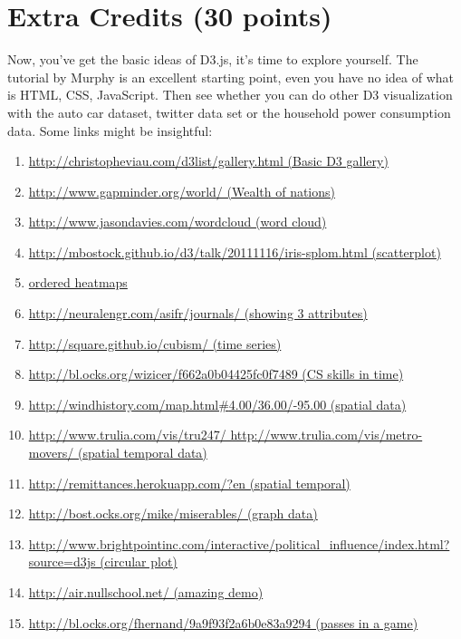 \documentclass[a4paper, 11pt]{article}
\begin{document}
\section{Extra Credits (30 points)}
Now, you've get the basic ideas of D3.js, it's time to explore yourself. The tutorial by Murphy is an excellent starting point, even you have no idea of what is HTML, CSS, JavaScript. Then see whether you can do other D3 visualization with the auto car dataset, twitter data set or the household power consumption data. Some links might be insightful:
\begin{enumerate}
\item \href{http://christopheviau.com/d3list/gallery.html}{http://christopheviau.com/d3list/gallery.html (Basic D3 gallery)}
\item \href{http://www.gapminder.org/world/}{http://www.gapminder.org/world/ (Wealth of nations)}
\item \href{http://www.jasondavies.com/wordcloud}{ http://www.jasondavies.com/wordcloud (word cloud)}
\item \href{http://mbostock.github.io/d3/talk/20111116/iris-splom.html}{http://mbostock.github.io/d3/talk/20111116/iris-splom.html (scatterplot)}
\item \href{http://astro.temple.edu/~tuc17157/em_ordering/basic_v2_wave_classes_flip.html}{ ordered heatmaps}
\item \href{http://neuralengr.com/asifr/journals/} {http://neuralengr.com/asifr/journals/ (showing 3 attributes)}
\item \href{http://square.github.io/cubism/}{http://square.github.io/cubism/ (time series)}
\item \href{http://bl.ocks.org/wizicer/f662a0b04425fc0f7489}{http://bl.ocks.org/wizicer/f662a0b04425fc0f7489 (CS skills in time)}
\item \href{http://windhistory.com/map.html4.00/36.00/-95.00}{http://windhistory.com/map.html\#{4.00}/36.00/-95.00 (spatial data)}
\item \href{}{http://www.trulia.com/vis/tru247/ http://www.trulia.com/vis/metro-movers/ (spatial temporal data)}
\item \href{http://remittances.herokuapp.com/?en}{http://remittances.herokuapp.com/?en (spatial temporal)}
\item \href{http://bost.ocks.org/mike/miserables/}{http://bost.ocks.org/mike/miserables/  (graph data)}
\item \href{http://www.brightpointinc.com/interactive/political_influence/index.html?source=d3js}{http://www.brightpointinc.com/interactive/political\_influence/index.html?source=d3js (circular plot)}
\item \href{http://air.nullschool.net/}{http://air.nullschool.net/ (amazing demo)}
\item \href{http://bl.ocks.org/fhernand/9a9f93f2a6b0e83a9294}{http://bl.ocks.org/fhernand/9a9f93f2a6b0e83a9294 (passes in a game)}

\end{enumerate}
\end{document}
